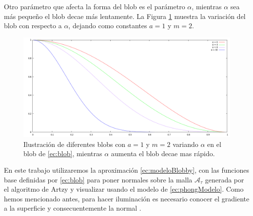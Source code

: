 Otro parámetro que afecta la forma del blob es el parámetro $\alpha$, mientras $\alpha$ sea más pequeño el blob decae más lentamente. La Figura \ref{fig:blobSmothness} muestra la variación del blob con respecto a $\alpha$, dejando como constantes $a = 1$ y $m = 2$.



\begin{figure}[htp]
 \centering
  \includegraphics[scale=0.3]{img/cap02/GraficaM2A1}
  \caption[Ilustración de diferentes blobs con $a = 1$ y $m = 2$ variando $\alpha$]{Ilustración de diferentes blobs con $a = 1$ y $m = 2$ variando $\alpha$ en el blob de \eqref{ec:blob}, mientras $\alpha$ aumenta el blob decae mas rápido.}
  \label{fig:blobSmothness}
\end{figure}

En este trabajo utilizaremos la aproximación \eqref{ec:modeloBlobby}, con las funciones base definidas por \eqref{ec:blob} para poner normales sobre la malla $\mathcal{A}_{\tau}$ generada por el algoritmo de Artzy y visualizar usando el modelo de \eqref{ec:phongModelo}. Como hemos mencionado antes, para hacer iluminación es necesario conocer el gradiente a la superficie y consecuentemente la normal \cite{bussCG}.

